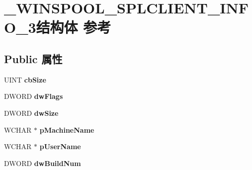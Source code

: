 \hypertarget{struct___w_i_n_s_p_o_o_l___s_p_l_c_l_i_e_n_t___i_n_f_o__3}{}\section{\+\_\+\+W\+I\+N\+S\+P\+O\+O\+L\+\_\+\+S\+P\+L\+C\+L\+I\+E\+N\+T\+\_\+\+I\+N\+F\+O\+\_\+3结构体 参考}
\label{struct___w_i_n_s_p_o_o_l___s_p_l_c_l_i_e_n_t___i_n_f_o__3}
\subsection*{Public 属性}
\begin{DoxyCompactItemize}
\item 
\mbox{\label{struct___w_i_n_s_p_o_o_l___s_p_l_c_l_i_e_n_t___i_n_f_o__3_a4bb64d6550b9804bd6727749a6ad09e7}} 
U\+I\+NT {\bfseries cb\+Size}
\item 
\mbox{\label{struct___w_i_n_s_p_o_o_l___s_p_l_c_l_i_e_n_t___i_n_f_o__3_a2764b8dae89f3c8ac9b3e81020b47d2c}} 
D\+W\+O\+RD {\bfseries dw\+Flags}
\item 
\mbox{\label{struct___w_i_n_s_p_o_o_l___s_p_l_c_l_i_e_n_t___i_n_f_o__3_af76c68a9c4284f9f6608a10e722d09aa}} 
D\+W\+O\+RD {\bfseries dw\+Size}
\item 
\mbox{\label{struct___w_i_n_s_p_o_o_l___s_p_l_c_l_i_e_n_t___i_n_f_o__3_a0a308b3654a82ecb825dba031729b80c}} 
W\+C\+H\+AR $\ast$ {\bfseries p\+Machine\+Name}
\item 
\mbox{\label{struct___w_i_n_s_p_o_o_l___s_p_l_c_l_i_e_n_t___i_n_f_o__3_a93091e1ec0949002f014ca250a669902}} 
W\+C\+H\+AR $\ast$ {\bfseries p\+User\+Name}
\item 
\mbox{\label{struct___w_i_n_s_p_o_o_l___s_p_l_c_l_i_e_n_t___i_n_f_o__3_ad78d6d39ddd75840e452181a418bdd1e}} 
D\+W\+O\+RD {\bfseries dw\+Build\+Num}

\end{DoxyCompactItemize}
